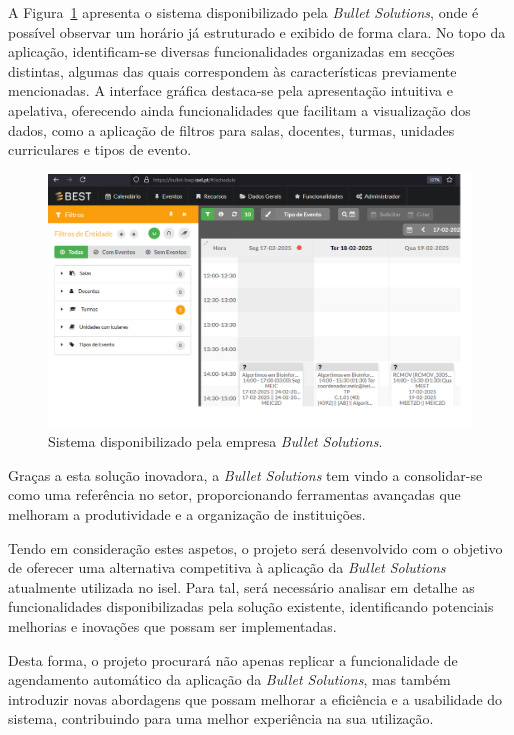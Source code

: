 A Figura~\ref{fig:software-bullet-solutions} apresenta o sistema disponibilizado pela \textit{Bullet Solutions}, onde é possível observar um horário já estruturado e exibido de forma clara. No topo da aplicação, identificam-se diversas funcionalidades organizadas em secções distintas, algumas das quais correspondem às características previamente mencionadas. A interface gráfica destaca-se pela apresentação intuitiva e apelativa, oferecendo ainda funcionalidades que facilitam a visualização dos dados, como a aplicação de filtros para salas, docentes, turmas, unidades curriculares e tipos de evento.

\begin{figure}[H]
    \centering
    \includegraphics[width=\linewidth]{Imagens/exemplo-bullet-solutions-software}
    \caption{Sistema disponibilizado pela empresa \textit{Bullet Solutions}.}
    \label{fig:software-bullet-solutions}
\end{figure}

Graças a esta solução inovadora, a \textit{Bullet Solutions} tem vindo a consolidar-se como uma referência no setor, proporcionando ferramentas avançadas que melhoram a produtividade e a organização de instituições.

Tendo em consideração estes aspetos, o projeto será desenvolvido com o objetivo de oferecer uma alternativa competitiva à aplicação da \textit{Bullet Solutions} atualmente utilizada no \gls{isel}. Para tal, será necessário analisar em detalhe as funcionalidades disponibilizadas pela solução existente, identificando potenciais melhorias e inovações que possam ser implementadas.

Desta forma, o projeto procurará não apenas replicar a funcionalidade de agendamento automático da aplicação da \textit{Bullet Solutions}, mas também introduzir novas abordagens que possam melhorar a eficiência e a usabilidade do sistema, contribuindo para uma melhor experiência na sua utilização.